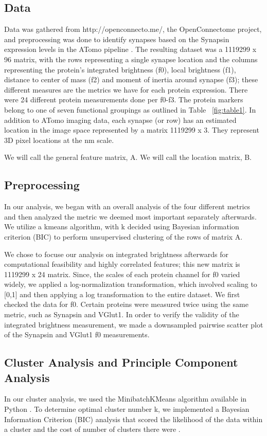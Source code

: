 \documentclass{article}
\begin{document}
\subsection{Data}
Data was gathered from http://openconnecto.me/, the OpenConnectome project, and preprocessing was done to identify synapses based on the Synapsin expression levels in the ATomo pipeline \cite{Weiler2014}. The resulting dataset was a 1119299 x 96 matrix, with the rows representing a single synapse location and the columns representing the protein's integrated brightness (f0), local brightness (f1), distance to center of mass (f2) and moment of inertia around synapse (f3); these different measures are the metrics we have for each protein expression. There were 24 different protein measurements done per f0-f3. The protein markers belong to one of seven functional groupings as outlined in Table ~\ref{fig:table1}. In addition to ATomo imaging data, each synapse (or row) has an estimated location in the image space represented by a matrix 1119299 x 3. They represent 3D pixel locations at the nm scale. 

We will call the general feature matrix, A. We will call the location matrix, B.

\subsection{Preprocessing}
In our analysis, we began with an overall analysis of the four different metrics and then analyzed the metric we deemed most important separately afterwards. We utilize a kmeans algorithm, with k decided using Bayesian information criterion (BIC) to perform unsupervised clustering of the rows of matrix A.

We chose to focuse our analysis on integrated brightness afterwards for computational feasibility and highly correlated features; this new matrix is 1119299 x 24 matrix. Since, the scales of each protein channel for f0 varied widely, we applied a log-normalization transformation, which involved scaling to [0,1] and then applying a log transformation to the entire dataset. We first checked the data for f0. Certain proteins were measured twice using the same metric, such as Synapsin and VGlut1. In order to verify the validity of the integrated brightness measurement, we made a downsampled pairwise scatter plot of the Synapsin and VGlut1 f0 measurements.

\subsection{Cluster Analysis and Principle Component Analysis}
In our cluster analysis, we used the MinibatchKMeans algorithm available in Python \cite{Sculley2010}. To determine optimal cluster number k, we implemented a Bayesian Information Criterion (BIC) analysis that scored the likelihood of the data within a cluster and the cost of number of clusters there were \cite{Fallis2013}. 
\end{document}
